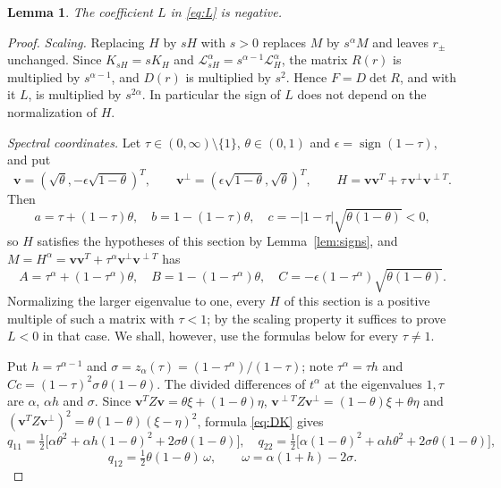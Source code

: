 \documentclass[11pt]{amsart}
\newtheorem{lemma}[theorem]{Lemma}
\theoremstyle{definition}
\theoremstyle{remark}
\numberwithin{equation}{section}
\newcommand{\cL}{\mathcal{L}}
\newcommand{\bv}{\mathbf{v}}
\begin{document}
\begin{lemma}\label{lem:L}
The coefficient $L$ in \eqref{eq:L} is negative.
\end{lemma}

\begin{proof}
\emph{Scaling.} Replacing $H$ by $sH$ with $s>0$ replaces $M$ by $s^\alpha M$ and leaves $r_\pm$ unchanged. Since $K_{sH}=sK_H$ and $\cL^\alpha_{sH}=s^{\alpha-1}\cL^\alpha_H$, the matrix $R(r)$ is multiplied by $s^{\alpha-1}$, and $D(r)$ is multiplied by $s^2$. Hence $F=D\det R$, and with it $L$, is multiplied by $s^{2\alpha}$. In particular the sign of $L$ does not depend on the normalization of $H$.

\emph{Spectral coordinates.} Let $\tau\in(0,\infty)\setminus\{1\}$, $\theta\in(0,1)$ and $\epsilon=\operatorname{sign}(1-\tau)$, and put
\[
\bv=(\sqrt\theta,-\epsilon\sqrt{1-\theta})^T,\qquad \bv^\perp=(\epsilon\sqrt{1-\theta},\sqrt\theta)^T,\qquad H=\bv\bv^T+\tau\,\bv^\perp\bv^{\perp T}.
\]
Then
\[
a=\tau+(1-\tau)\theta,\quad b=1-(1-\tau)\theta,\quad c=-|1-\tau|\sqrt{\theta(1-\theta)}<0,
\]
so $H$ satisfies the hypotheses of this section by Lemma~\ref{lem:signs}, and $M=H^\alpha=\bv\bv^T+\tau^\alpha\bv^\perp\bv^{\perp T}$ has
\[
A=\tau^\alpha+(1-\tau^\alpha)\theta,\quad B=1-(1-\tau^\alpha)\theta,\quad C=-\epsilon(1-\tau^\alpha)\sqrt{\theta(1-\theta)} .
\]
Normalizing the larger eigenvalue to one, every $H$ of this section is a positive multiple of such a matrix with $\tau<1$; by the scaling property it suffices to prove $L<0$ in that case. We shall, however, use the formulas below for every $\tau\ne1$.

Put $h=\tau^{\alpha-1}$ and $\sigma=z_\alpha(\tau)=(1-\tau^\alpha)/(1-\tau)$; note $\tau^\alpha=\tau h$ and $Cc=(1-\tau)^2\sigma\,\theta(1-\theta)$. The divided differences of $t^\alpha$ at the eigenvalues $1,\tau$ are $\alpha$, $\alpha h$ and $\sigma$. Since $\bv^TZ\bv=\theta\xi+(1-\theta)\eta$, $\bv^{\perp T}Z\bv^\perp=(1-\theta)\xi+\theta\eta$ and $(\bv^TZ\bv^\perp)^2=\theta(1-\theta)(\xi-\eta)^2$, formula \eqref{eq:DK} gives
\[
q_{11}=\tfrac12\bigl[\alpha\theta^2+\alpha h(1-\theta)^2+2\sigma\theta(1-\theta)\bigr],\quad
q_{22}=\tfrac12\bigl[\alpha(1-\theta)^2+\alpha h\theta^2+2\sigma\theta(1-\theta)\bigr],
\]
\[
q_{12}=\tfrac12\theta(1-\theta)\,\omega,\qquad \omega=\alpha(1+h)-2\sigma .
\]


\end{proof}
\end{document}
